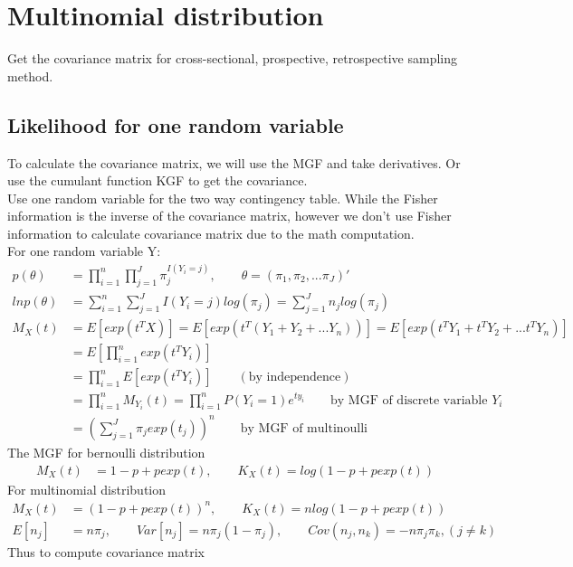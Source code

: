 	\section{Multinomial distribution}
	Get the covariance matrix for cross-sectional, prospective, retrospective sampling method.\\
	\subsection{Likelihood for one random variable}
	To calculate the covariance matrix, we will use the MGF and take derivatives. Or use the cumulant function KGF to get the covariance.\\
	Use one random variable for the two way contingency table. While the Fisher information is the inverse of the covariance matrix, however we don't use Fisher information to calculate covariance matrix due to the math computation.\\
	For one random variable Y:
	\begin{align*}
		p(\theta) &= \prod_{i=1}^n \prod_{j=1}^J \pi_{j}^{I(Y_{i} = j)}, \qquad \theta = (\pi_1, \pi_2, ... \pi_J)'\\
		ln p(\theta) &= \sum_{i=1}^n \sum_{j=1}^J I(Y_{i}=j)log( \pi_{j}) = \sum_{j=1}^J n_j log(\pi_{j})\\
		M_X(t) &= E[exp(t^TX)] = E[exp(t^T(Y_1 + Y_2 +... Y_n))] = E[exp(t^TY_1 + t^TY_2 + ... t^TY_n)]\\
		&= E[\prod_{i=1}^n exp(t^TY_i)]\\
		&= \prod_{i=1}^n E[exp(t^TY_i)]  \qquad (\text{by independence})\\
		&= \prod_{i=1}^n M_{Y_i}(t) = \prod_{i=1}^n P(Y_i= 1) e^{ty_i}\qquad  \text{by MGF of discrete variable $Y_i$}\\
		&= \left( \sum_{j=1}^J \pi_j exp(t_j)\right)^n \qquad \text{by MGF of multinoulli}
	\end{align*}
	The MGF for bernoulli distribution
	\begin{align*}
		M_X(t) &= 1-p + p exp(t), \qquad K_X(t) = log (1-p + p exp(t))
	\end{align*}
	For multinomial distribution
	\begin{align*}
		M_X(t) &= (1-p + p exp(t))^n, \qquad K_X(t) = n log (1-p + p exp(t))\\
		E[n_j] &= n\pi_j, \qquad Var[n_j] = n\pi_j(1-\pi_j), \qquad Cov(n_j, n_k) = -n\pi_j\pi_k, {(j \neq k)}
	\end{align*}    
	Thus to compute covariance matrix
